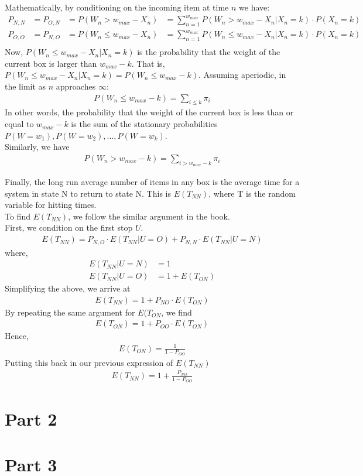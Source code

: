 \documentclass[10pt,a4paper]{article}
\begin{document}
Mathematically, by conditioning on the incoming item at time $ n $ we have:\\
\begin{align*}
P_{N,N} &= P_{O,N} &= P(W_n > w_{max} -X_n) &= \sum\limits_{n=1}^{w_{max}} P(W_n > w_{max} -X_n | X_n=k)\cdot P(X_n=k)  \\
P_{O,O} &= P_{N,O} &= P(W_n \leq w_{max} -X_n) &=\sum\limits_{n=1}^{w_{max}} P(W_n \leq w_{max} -X_n | X_n=k)\cdot P(X_n=k) \\
\end{align*}
Now, $ P(W_n \leq w_{max} -X_n | X_n=k) $ is the probability that the weight of the current box is larger than $ w_{max} - k $. That is, $ P(W_n \leq w_{max} -X_n | X_n=k) = P(W_n \leq w_{max} -k)$. Assuming aperiodic, in the limit as $ n $ approaches $ \infty $:\\
\begin{align*}
P(W_n \leq w_{max} -k)= \sum_{i \leq k} \pi_i
\end{align*}
In other words, the probability that the weight of the current box is less than or equal to $ w_{max} - k $ is the sum of the stationary probabilities  $ P(W=w_1),P(W=w_2),...,P(W=w_k) $.\\
Similarly, we have \\
\begin{align*}
P(W_n > w_{max}-k)= \sum_{i > w_{max} -k} \pi_i 
\end{align*}



Finally, the long run average number of items in any box is the average time for a system in state N to return to state N. This is $ E(T_{NN}) $, where T is the random variable for hitting times. \\
To find $ E(T_{NN}) $, we follow the similar argument in the book. \\
First, we condition on the first stop $ U $. 
\begin{align*}
E(T_{NN}) = P_{N,O}\cdot E(T_{NN}|U=O)+P_{N,N}\cdot E(T_{NN}|U=N)
\end{align*}
where,\\
\begin{align*}
E(T_{NN}|U=N) &= 1 \\
E(T_{NN}|U=O) &= 1+E(T_{ON})
\end{align*}
Simplifying the above, we arrive at\\
\begin{align*}
E(T_{NN}) = 1+ P_{NO}\cdot E(T_{ON})
\end{align*}
By repeating the same argument for $ E(T_{ON} $, we find \\
\begin{align*}
E(T_{ON}) = 1+ P_{OO}\cdot E(T_{ON})
\end{align*}
Hence, 
\begin{align*}
E(T_{ON}) = \frac{1}{1 - P_{OO}}
\end{align*}
Putting this back in our previous expression of $ E(T_{NN}) $
\begin{align*}
E(T_{NN}) = 1+ \frac{P_{NO}}{1 - P_{OO}}
\end{align*}


\section{Part 2}



\section{Part 3}
\end{document}
